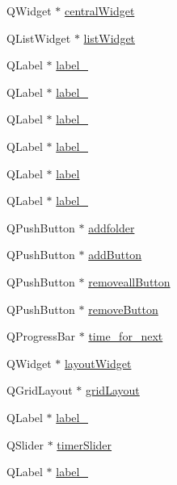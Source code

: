 \begin{DoxyCompactItemize}
\item 
QWidget $\ast$ \hyperlink{classUi__MainWindow_a30075506c2116c3ed4ff25e07ae75f81}{centralWidget}
\item 
QListWidget $\ast$ \hyperlink{classUi__MainWindow_ae647a15635ba8a0e5d5aec475db99d8f}{listWidget}
\item 
QLabel $\ast$ \hyperlink{classUi__MainWindow_ad6bab8fb8903b8f41afea1218ee52695}{label\_}
\item 
QLabel $\ast$ \hyperlink{classUi__MainWindow_a663f728e6244926a795c6e6892673b1d}{label\_}
\item 
QLabel $\ast$ \hyperlink{classUi__MainWindow_a13936e6f18b1c90402b3c7a3c92b6cdb}{label\_}
\item 
QLabel $\ast$ \hyperlink{classUi__MainWindow_af183bfbfb9f38bbdd60caf92b15e23dc}{label\_}
\item 
QLabel $\ast$ \hyperlink{classUi__MainWindow_ad9c89133780f28e6efa2ec17ceb9cff5}{label}
\item 
QLabel $\ast$ \hyperlink{classUi__MainWindow_a0e90c7e9ad77386881e0b264ddb9dd22}{label\_}
\item 
QPushButton $\ast$ \hyperlink{classUi__MainWindow_ac80c9560810ddceb7494fa1f77079559}{addfolder}
\item 
QPushButton $\ast$ \hyperlink{classUi__MainWindow_a1761410af45480e8a833dae3c88e96e4}{addButton}
\item 
QPushButton $\ast$ \hyperlink{classUi__MainWindow_ab1e1013dda0abf675c1b37639a0b8f51}{removeallButton}
\item 
QPushButton $\ast$ \hyperlink{classUi__MainWindow_ae4ea0ab11a595b2a964115c05f7603f4}{removeButton}
\item 
QProgressBar $\ast$ \hyperlink{classUi__MainWindow_ad200a2549a1067eff25bb476691c6555}{time\_\-for\_\-next}
\item 
QWidget $\ast$ \hyperlink{classUi__MainWindow_ab96ab0f0578098521fa69a75aa5cdde8}{layoutWidget}
\item 
QGridLayout $\ast$ \hyperlink{classUi__MainWindow_a525ed3c5fe0784ac502ee222fba4e205}{gridLayout}
\item 
QLabel $\ast$ \hyperlink{classUi__MainWindow_a2e2516d755e4dd53fc905dabddf2738a}{label\_}
\item 
QSlider $\ast$ \hyperlink{classUi__MainWindow_aed2eea321894fe7a8f3e23b78fc42793}{timerSlider}
\item 
QLabel $\ast$ \hyperlink{classUi__MainWindow_a9dc4dba26b83e0c94aa566e1c564420b}{label\_}
\item 

\end{DoxyCompactItemize}
